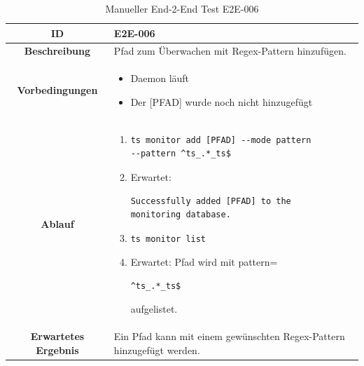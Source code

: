 \documentclass[a4paper,12pt]{report}
\begin{document}
    \begin{table}[h!]
        \centering
        \setlength{\leftmargini}{0.8cm}
        \begin{tabular}{|c|p{10cm}|}
            \hline
            \textbf{ID}                  & E2E-006                                                               \\ \hline
            \textbf{Beschreibung}        & Pfad zum Überwachen mit Regex-Pattern hinzufügen.                     \\ \hline
            \textbf{Vorbedingungen} &
            \begin{itemize}
                \item Daemon läuft
                \item  Der [PFAD] wurde noch nicht hinzugefügt
            \end{itemize} \\ \hline
            \textbf{Ablauf} &
            \begin{enumerate}
                \item \begin{verbatim}ts monitor add [PFAD] --mode pattern
--pattern ^ts_.*_ts$
                \end{verbatim}
                \item Erwartet: \begin{verbatim}Successfully added [PFAD] to the
monitoring database.
                \end{verbatim}
                \item \begin{verbatim}ts monitor list
                \end{verbatim}
                \item Erwartet: Pfad wird mit pattern=\begin{verbatim}^ts_.*_ts$
                \end{verbatim} aufgelistet.
            \end{enumerate} \\ \hline
            \textbf{Erwartetes Ergebnis} & Ein Pfad kann mit einem gewünschten Regex-Pattern hinzugefügt werden. \\ \hline
        \end{tabular}
        \caption{Manueller End-2-End Test E2E-006}\label{tab:e2e-6}
    \end{table}
\end{document}
